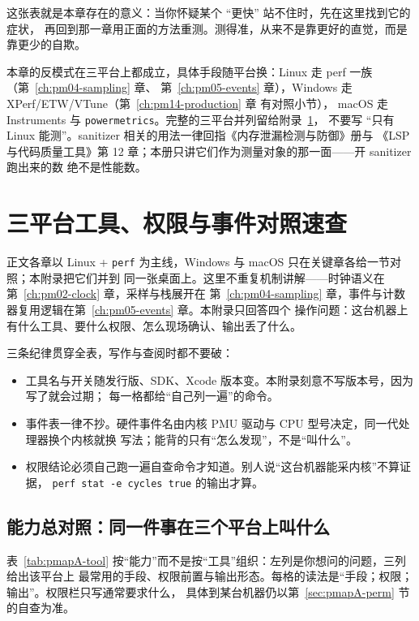 \documentclass[12pt,a4paper,fontset=fandol]{ctexbook}
\newcommand{\Tp}[1]{\texttt{#1}}
\begin{document}
这张表就是本章存在的意义：当你怀疑某个 ``更快'' 站不住时，先在这里找到它的症状，
再回到那一章用正面的方法重测。测得准，从来不是靠更好的直觉，而是靠更少的自欺。

\begin{note}[title={三平台与 sanitizer 的口径收束}]
本章的反模式在三平台上都成立，具体手段随平台换：Linux 走 perf 一族（第~\ref{ch:pm04-sampling} 章、
第~\ref{ch:pm05-events} 章），Windows 走 XPerf/ETW/VTune（第~\ref{ch:pm14-production} 章 有对照小节），
macOS 走 Instruments 与 \Tp{powermetrics}。完整的三平台并列留给附录~\ref{ch:pmapA-platform}，
不要写 ``只有 Linux 能测''。sanitizer 相关的用法一律回指《内存泄漏检测与防御》册与
《LSP 与代码质量工具》第 12 章；本册只讲它们作为测量对象的那一面——开 sanitizer 跑出来的数
绝不是性能数。
\end{note}

\appendix
\chapter{三平台工具、权限与事件对照速查}
\label{ch:pmapA-platform}

正文各章以 Linux + \Tp{perf} 为主线，Windows 与 macOS 只在关键章各给一节对照；本附录把它们并到
同一张桌面上。这里不重复机制讲解——时钟语义在第~\ref{ch:pm02-clock} 章，采样与栈展开在
第~\ref{ch:pm04-sampling} 章，事件与计数器复用逻辑在第~\ref{ch:pm05-events} 章。本附录只回答四个
操作问题：这台机器上有什么工具、要什么权限、怎么现场确认、输出丢了什么。

三条纪律贯穿全表，写作与查阅时都不要破：

\begin{itemize}
  \item 工具名与开关随发行版、SDK、Xcode 版本变。本附录刻意不写版本号，因为写了就会过期；
        每一格都给``自己列一遍''的命令。
  \item 事件表一律不抄。硬件事件名由内核 PMU 驱动与 CPU 型号决定，同一代处理器换个内核就换
        写法；能背的只有``怎么发现''，不是``叫什么''。
  \item 权限结论必须自己跑一遍自查命令才知道。别人说``这台机器能采内核''不算证据，
        \Tp{perf stat -e cycles true} 的输出才算。
\end{itemize}

\section{能力总对照：同一件事在三个平台上叫什么}

表~\ref{tab:pmapA-tool} 按``能力''而不是按``工具''组织：左列是你想问的问题，三列给出该平台上
最常用的手段、权限前置与输出形态。每格的读法是``手段；权限；输出''。权限栏只写通常要求什么，
具体到某台机器仍以第~\ref{sec:pmapA-perm} 节的自查为准。
\end{document}
